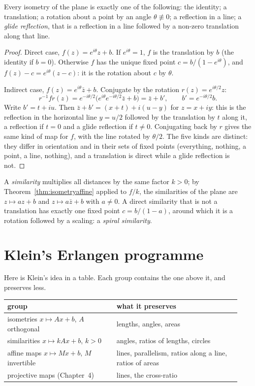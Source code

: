 \begin{theorem}\label{thm:chasles}
Every isometry of the plane is exactly one of the following: the identity; a translation; a rotation about a point by an angle
$\theta\not\equiv0$; a reflection in a line; a \emph{glide reflection}, that is a reflection in a line followed by a non-zero translation
along that line.
\end{theorem}
\begin{proof}
Direct case, $f(z)=e^{i\theta}z+b$. If $e^{i\theta}=1$, $f$ is the translation by $b$ (the identity if $b=0$). Otherwise $f$ has the unique
fixed point $c=b/(1-e^{i\theta})$, and $f(z)-c=e^{i\theta}(z-c)$: it is the rotation about $c$ by $\theta$.

Indirect case, $f(z)=e^{i\theta}\bar z+b$. Conjugate by the rotation $r(z)=e^{i\theta/2}z$:
\[
r^{-1}fr(z)=e^{-i\theta/2}\bigl(e^{i\theta}e^{-i\theta/2}\bar z+b\bigr)=\bar z+b',\qquad b'=e^{-i\theta/2}b.
\]
Write $b'=t+iu$. Then $\bar z+b'=(x+t)+i(u-y)$ for $z=x+iy$: this is the reflection in the horizontal line $y=u/2$ followed by the
translation by $t$ along it, a reflection if $t=0$ and a glide reflection if $t\ne0$. Conjugating back by $r$ gives the same kind of map
for $f$, with the line rotated by $\theta/2$. The five kinds are distinct: they differ in orientation and in their sets of fixed points
(everything, nothing, a point, a line, nothing), and a translation is direct while a glide reflection is not.
\end{proof}

A \emph{similarity} multiplies all distances by the same factor $k>0$; by Theorem~\ref{thm:isometryaffine} applied to $f/k$, the
similarities of the plane are $z\mapsto az+b$ and $z\mapsto a\bar z+b$ with $a\ne0$. A direct similarity that is not a translation has
exactly one fixed point $c=b/(1-a)$, around which it is a rotation followed by a scaling: a \emph{spiral similarity}.

\section{Klein's Erlangen programme}

Here is Klein's idea in a table. Each group contains the one above it, and preserves less.

\medskip
\begin{center}
\begin{tabular}{@{}p{0.44\linewidth}p{0.5\linewidth}@{}}
\hline
group & what it preserves\\
\hline
isometries $x\mapsto Ax+b$, $A$ orthogonal & lengths, angles, areas\\
similarities $x\mapsto kAx+b$, $k>0$ & angles, ratios of lengths, circles\\
affine maps $x\mapsto Mx+b$, $M$ invertible & lines, parallelism, ratios along a line, ratios of areas\\
projective maps (Chapter~4) & lines, the cross-ratio\\
\hline
\end{tabular}
\end{center}
\medskip

